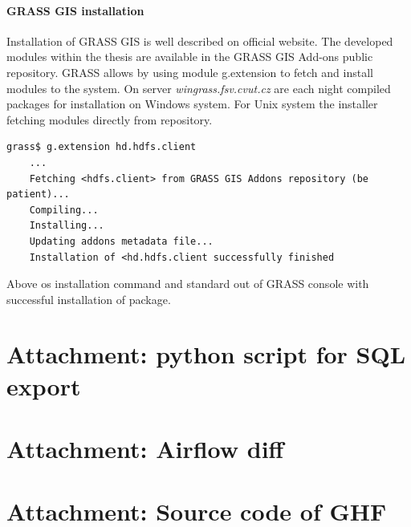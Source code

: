 \documentclass[a4paper,12pt,oneside]{report}
\begin{document}
		
		\paragraph{GRASS GIS installation}
		Installation of GRASS GIS is well described on official website. The developed
		modules within the thesis are available in the GRASS GIS Add-ons public repository.
		GRASS allows by using module g.extension to fetch and install modules to the system.
		On server \textit{wingrass.fsv.cvut.cz} are each night compiled packages for
		installation on Windows system. For Unix system the installer  fetching modules directly from repository. 
		\begin{footnotesize}
			\begin{lstlisting}[style=python]
	grass$ g.extension hd.hdfs.client
	...
	Fetching <hdfs.client> from GRASS GIS Addons repository (be patient)...
	Compiling...
	Installing...
	Updating addons metadata file...
	Installation of <hd.hdfs.client successfully finished
			\end{lstlisting}
		\end{footnotesize}
		Above os installation command and standard out of GRASS console with successful
		installation of package. 
		
	\section{Attachment: python script for SQL export}
	
	
	\section{Attachment: Airflow diff}\label{airflow_diff}
	
	\section{Attachment: Source code of GHF}\label{att:install}
	
\end{document}
